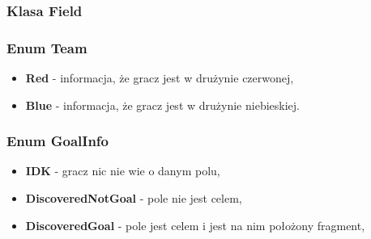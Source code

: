 \documentclass[../Dokumentacja.tex]{subfiles}
\begin{document}
\subsubsection{Klasa Field}
\begin{methods}
\end{methods}
\subsubsection{Enum Team}
\begin{itemize}
    \item \textbf{Red} - informacja, że gracz jest w drużynie czerwonej,
    \item \textbf{Blue} - informacja, że gracz jest w drużynie niebieskiej.
\end{itemize}
\subsubsection{Enum GoalInfo}
\begin{itemize}
    \item \textbf{IDK} - gracz nic nie wie o danym polu,
    \item \textbf{DiscoveredNotGoal} - pole nie jest celem,
    \item \textbf{DiscoveredGoal} - pole jest celem i jest na nim położony fragment,
\end{itemize}
\end{document}
